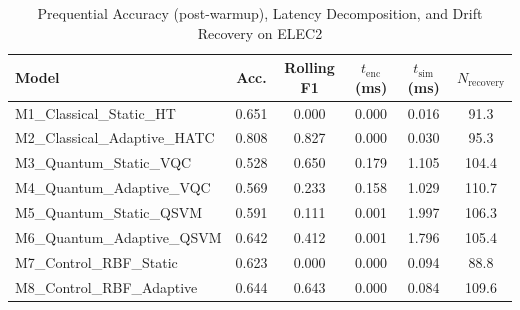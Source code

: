 \begin{table}[htbp]
\centering
\caption{Prequential Accuracy (post-warmup), Latency Decomposition, and Drift Recovery on ELEC2}
\begin{tabular}{lccccc}
\hline
Model & Acc. & Rolling F1 & $t_{\text{enc}}$ (ms) & $t_{\text{sim}}$ (ms) & $N_{\text{recovery}}$ \\
\hline
M1\_Classical\_Static\_HT & 0.651 & 0.000 & 0.000 & 0.016 & 91.3 \\
M2\_Classical\_Adaptive\_HATC & 0.808 & 0.827 & 0.000 & 0.030 & 95.3 \\
M3\_Quantum\_Static\_VQC & 0.528 & 0.650 & 0.179 & 1.105 & 104.4 \\
M4\_Quantum\_Adaptive\_VQC & 0.569 & 0.233 & 0.158 & 1.029 & 110.7 \\
M5\_Quantum\_Static\_QSVM & 0.591 & 0.111 & 0.001 & 1.997 & 106.3 \\
M6\_Quantum\_Adaptive\_QSVM & 0.642 & 0.412 & 0.001 & 1.796 & 105.4 \\
M7\_Control\_RBF\_Static & 0.623 & 0.000 & 0.000 & 0.094 & 88.8 \\
M8\_Control\_RBF\_Adaptive & 0.644 & 0.643 & 0.000 & 0.084 & 109.6 \\
\hline
\end{tabular}
\end{table}

